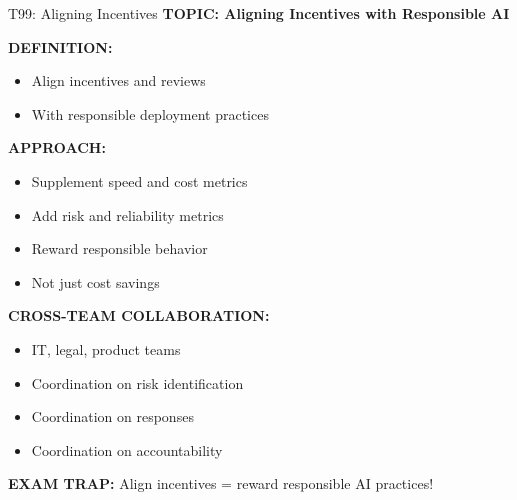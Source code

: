 \documentclass[8pt]{beamer}
\begin{document}
	\begin{frame}{T99: Aligning Incentives}
		\fontsize{6.5}{7.5}\selectfont
		\textbf{TOPIC: Aligning Incentives with Responsible AI}
		
		\vspace{0.1cm}
		\textbf{DEFINITION:}
		\begin{itemize}
			\item Align incentives and reviews
			\item With responsible deployment practices
		\end{itemize}
		
		\vspace{0.1cm}
		\textbf{APPROACH:}
		\begin{itemize}
			\item Supplement speed and cost metrics
			\item Add risk and reliability metrics
			\item Reward responsible behavior
			\item Not just cost savings
		\end{itemize}
		
		\vspace{0.1cm}
		\textbf{CROSS-TEAM COLLABORATION:}
		\begin{itemize}
			\item IT, legal, product teams
			\item Coordination on risk identification
			\item Coordination on responses
			\item Coordination on accountability
		\end{itemize}
		
		\textcolor{myred}{\textbf{EXAM TRAP:}} Align incentives = \textcolor{myblue}{reward responsible AI practices}!
	\end{frame}
	
\end{document}
